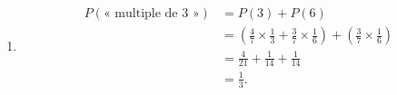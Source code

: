 {\begin{enumerate}
		\item
			\begin{align*}
				P(\text{« multiple de $3$ »}) &= P(3) + P(6) \\
					&= \left( \frac47 \times \frac13 + \frac37\times\frac16 \right) + \left( \frac37 \times \frac16 \right) \\
					&= \frac4{21} + \frac1{14} + \frac1{14} \\
					&= \frac13.
			\end{align*}
	\end{enumerate}
}

\newpage

